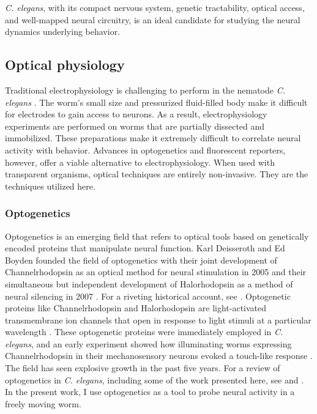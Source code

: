 \textit{C. elegans}, with its compact nervous system, genetic tractability,  optical access, and well-mapped neural circuitry, is an ideal candidate for studying the neural dynamics underlying behavior.

\subsection{Optical physiology}
Traditional electrophysiology is challenging to perform in the nematode \textit{C. elegans} \citep{goodman_active_1998, schafer_neurophysiological_2006}. The worm's small size and pressurized fluid-filled body make it difficult for electrodes to gain access to neurons.  As a result, electrophysiology experiments are  performed on worms that are partially dissected and immobilized. These preparations make it extremely difficult to correlate neural activity with behavior.  Advances in optogenetics and fluorescent reporters, however,  offer a viable alternative to electrophysiology. When used with transparent organisms, optical techniques are entirely non-invasive. They are the techniques utilized here. 

\subsubsection{Optogenetics}
Optogenetics is an emerging field that refers to optical tools based on genetically encoded proteins that manipulate neural function. Karl Deisseroth and Ed Boyden founded the field of optogenetics with their joint development of Channelrhodopsin as an optical method for neural stimulation in  2005 \citep{boyden_millisecond-timescale_2005} and their simultaneous but independent development of Halorhodopsin as a method of neural silencing in 2007 \citep{zhang_multimodal_2007, han_multiple-color_2007}.  For a riveting historical account, see \citep{boyden_history_2011}. Optogenetic proteins like Channelrhodopsin and Halorhodopsin are light-activated transmembrane ion channels that open in response to light stimuli at a particular wavelength \citep{nagel_channelrhodopsin-2_2003, yizhar_optogenetics_2011, fenno_development_2011}. These optogenetic proteins were immediately employed  in \textit{C. elegans}, and an early experiment showed how illuminating worms expressing Channelrhodopsin in their mechanosensory neurons evoked a touch-like response  \citep{nagel_light_2005}.  The field has seen explosive growth in the past five years. For a review of optogenetics in \textit{C. elegans}, including some of the work presented here, see \citep{xu_early_2011} and \citep{yizhar_optogenetics_2011}. In the present work, I use optogenetics as a tool to probe neural activity in a freely moving worm. 


